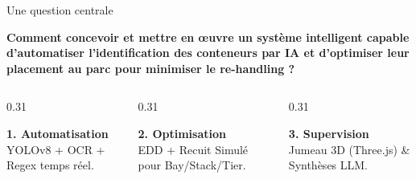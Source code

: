 \documentclass[aspectratio=169,french]{beamer}
\begin{document}
\begin{frame}{Une question centrale}
  \begin{tcolorbox}[colback=white,colframe=RefBlue,arc=3mm,boxrule=1.2pt,halign=center]
    \small\bfseries\textcolor{RefBlue}{Comment concevoir et mettre en œuvre un système intelligent capable d'automatiser l'identification des conteneurs par IA et d'optimiser leur placement au parc pour minimiser le re-handling ?}
  \end{tcolorbox}
  
  \vspace{0.2cm}
  \begin{columns}[t]
    \begin{column}{0.31\textwidth}
      \begin{tcolorbox}[cardstyle,halign=center]
        \small\textbf{\textcolor{RefOrange}{1. Automatisation}}\\
        \tiny YOLOv8 + OCR + Regex temps réel.
      \end{tcolorbox}
    \end{column}
    \begin{column}{0.31\textwidth}
      \begin{tcolorbox}[cardstyle,halign=center]
        \small\textbf{\textcolor{RefOrange}{2. Optimisation}}\\
        \tiny EDD + Recuit Simulé pour Bay/Stack/Tier.
      \end{tcolorbox}
    \end{column}
    \begin{column}{0.31\textwidth}
      \begin{tcolorbox}[cardstyle,halign=center]
        \small\textbf{\textcolor{RefOrange}{3. Supervision}}\\
        \tiny Jumeau 3D (Three.js) \& Synthèses LLM.
      \end{tcolorbox}
    \end{column}
  \end{columns}
\end{frame}
\end{document}
